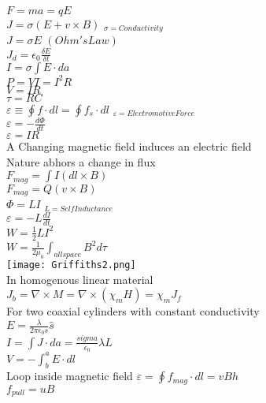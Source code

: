 \documentclass[1pt]{report}
\begin{document}
\begin{multicols}{3}
\begin{flushleft}
$F=ma=qE$\\
$J=\sigma(E+v\times B)$ $_{\sigma=Conductivity}$\\
$J=\sigma E$ $(Ohm's Law)$\\
$J_d=\epsilon_0\frac{\delta E}{\delta t}$\\
$I=\sigma\int E\cdot da$\\
$P=VI=I^2R$\\
$V=IR$\\
$\tau=RC$\\
$\varepsilon\equiv\oint f\cdot dl=\oint f_s\cdot dl$ $_{\varepsilon=ElectromotiveForce}$\\
$\varepsilon=-\frac{d\Phi}{dt}$\\
$\varepsilon=IR$\\
A Changing magnetic field induces an electric field\\
Nature abhors a change in flux\\
$F_{mag}=\int I(dl\times B)$\\
$F_{mag}=Q(v\times B)$\\
$\Phi=LI$ $_{L=SelfInductance}$\\
$\varepsilon=-L\frac{dI}{dt}$\\
$W=\frac{1}{2}LI^2$\\
$W=\frac{1}{2\mu_0}\int_{all space} B^2d\tau$\\
\texttt{[image: Griffiths2.png]}\\
In homogenous linear material\\
$J_b=\nabla\times M=\nabla\times(\chi_m H)=\chi_m J_f$\\
For two coaxial cylinders with constant conductivity\\
$E=\frac{\lambda}{2\pi\epsilon_0 s}\hat{s}$\\
$I=\int J\cdot da=\frac{sigma}{\epsilon_0}\lambda L$\\
$V=-\int_b^a E\cdot dl$\\
Loop inside magnetic field
$\varepsilon=\oint f_{mag}\cdot dl=vBh$\\
$f_{pull}=uB$\\
\end{flushleft}
\end{multicols}
\end{document}
